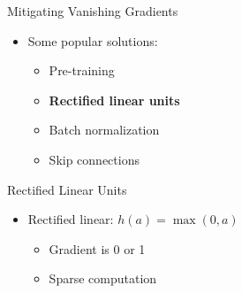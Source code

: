 \documentclass[11pt,table]{beamer}
\begin{document}
\begin{frame}{Mitigating Vanishing Gradients}


\begin{itemize}
    \item Some popular solutions:
\begin{itemize}
    \item Pre-training
\item \textbf{Rectified linear units}
\item Batch normalization
\item Skip connections
 
\end{itemize} 
\end{itemize}
    
\end{frame}

\begin{frame}{Rectified Linear Units}
    \begin{itemize}
        \item Rectified linear: $h(a)=\max (0, a)$
        \begin{itemize}
            \item Gradient is 0 or 1
\item Sparse computation
 
        \end{itemize}

    \end{itemize}
\end{frame}
\end{document}
